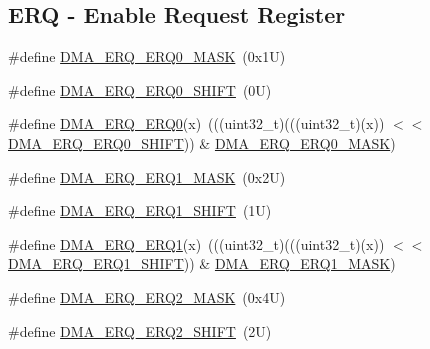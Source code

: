 \subsection*{E\+RQ -\/ Enable Request Register}
\begin{DoxyCompactItemize}
\item 
\#define \mbox{\hyperlink{group___d_m_a___register___masks_ga0be17ff8fd5c65b049c533d5606d2231}{D\+M\+A\+\_\+\+E\+R\+Q\+\_\+\+E\+R\+Q0\+\_\+\+M\+A\+SK}}~(0x1\+U)
\item 
\#define \mbox{\hyperlink{group___d_m_a___register___masks_gac2a8539f558af723e44dd20693d6f6df}{D\+M\+A\+\_\+\+E\+R\+Q\+\_\+\+E\+R\+Q0\+\_\+\+S\+H\+I\+FT}}~(0\+U)
\item 
\#define \mbox{\hyperlink{group___d_m_a___register___masks_ga7f60172ecb673853ff52916ee024c67d}{D\+M\+A\+\_\+\+E\+R\+Q\+\_\+\+E\+R\+Q0}}(x)~(((uint32\+\_\+t)(((uint32\+\_\+t)(x)) $<$$<$ \mbox{\hyperlink{group___d_m_a___register___masks_gac2a8539f558af723e44dd20693d6f6df}{D\+M\+A\+\_\+\+E\+R\+Q\+\_\+\+E\+R\+Q0\+\_\+\+S\+H\+I\+FT}})) \& \mbox{\hyperlink{group___d_m_a___register___masks_ga0be17ff8fd5c65b049c533d5606d2231}{D\+M\+A\+\_\+\+E\+R\+Q\+\_\+\+E\+R\+Q0\+\_\+\+M\+A\+SK}})
\item 
\#define \mbox{\hyperlink{group___d_m_a___register___masks_ga76c16a768a3f551712db28e2452be75d}{D\+M\+A\+\_\+\+E\+R\+Q\+\_\+\+E\+R\+Q1\+\_\+\+M\+A\+SK}}~(0x2\+U)
\item 
\#define \mbox{\hyperlink{group___d_m_a___register___masks_ga8bb73e9ba811c7c597b7f407a0e964de}{D\+M\+A\+\_\+\+E\+R\+Q\+\_\+\+E\+R\+Q1\+\_\+\+S\+H\+I\+FT}}~(1\+U)
\item 
\#define \mbox{\hyperlink{group___d_m_a___register___masks_ga89d796d7b37512cfe49d7c226ba0df6e}{D\+M\+A\+\_\+\+E\+R\+Q\+\_\+\+E\+R\+Q1}}(x)~(((uint32\+\_\+t)(((uint32\+\_\+t)(x)) $<$$<$ \mbox{\hyperlink{group___d_m_a___register___masks_ga8bb73e9ba811c7c597b7f407a0e964de}{D\+M\+A\+\_\+\+E\+R\+Q\+\_\+\+E\+R\+Q1\+\_\+\+S\+H\+I\+FT}})) \& \mbox{\hyperlink{group___d_m_a___register___masks_ga76c16a768a3f551712db28e2452be75d}{D\+M\+A\+\_\+\+E\+R\+Q\+\_\+\+E\+R\+Q1\+\_\+\+M\+A\+SK}})
\item 
\#define \mbox{\hyperlink{group___d_m_a___register___masks_gaa851ac71085a14b3d7db10f642f3254c}{D\+M\+A\+\_\+\+E\+R\+Q\+\_\+\+E\+R\+Q2\+\_\+\+M\+A\+SK}}~(0x4\+U)
\item 
\#define \mbox{\hyperlink{group___d_m_a___register___masks_gac02628eae8fb2e01bd5703bb1ae5f7d5}{D\+M\+A\+\_\+\+E\+R\+Q\+\_\+\+E\+R\+Q2\+\_\+\+S\+H\+I\+FT}}~(2\+U)
\item 

\end{DoxyCompactItemize}
